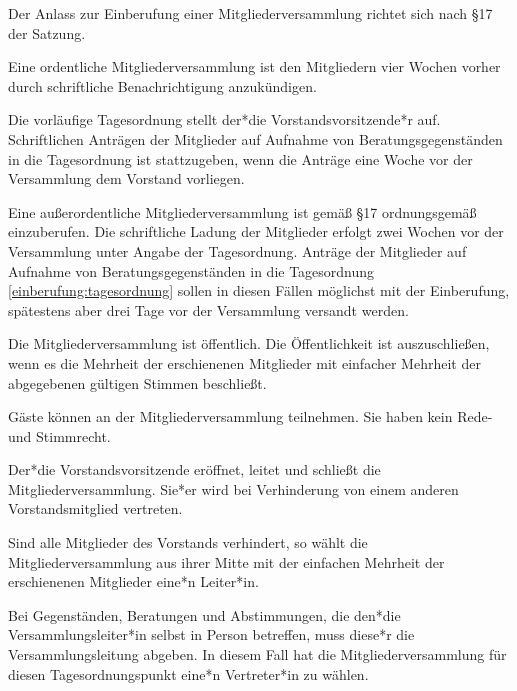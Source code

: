 \begin{gfmitglieder}


  Der Anlass zur Einberufung einer Mitgliederversammlung richtet sich nach \S 17 der Satzung.

  Eine ordentliche Mitgliederversammlung ist den Mitgliedern vier Wochen vorher durch schriftliche Benachrichtigung anzukündigen.

  Die vorläufige Tagesordnung stellt der*die Vorstandsvorsitzende*r auf. Schriftlichen Anträgen der Mitglieder auf Aufnahme von Beratungsgegenständen in die Tagesordnung ist stattzugeben, wenn die Anträge eine Woche vor der Versammlung dem Vorstand vorliegen.
  \label{einberufung:tagesordnung}

  Eine au\ss{}erordentliche Mitgliederversammlung ist gemä\ss{} \S 17 ordnungsgemä\ss{} einzuberufen. Die schriftliche Ladung der Mitglieder erfolgt zwei Wochen vor der Versammlung unter Angabe der Tagesordnung. Anträge der Mitglieder auf Aufnahme von Beratungsgegenständen in die Tagesordnung \ref{einberufung:tagesordnung} sollen in diesen Fällen möglichst mit der Einberufung, spätestens aber drei Tage vor der Versammlung versandt werden.


  Die Mitgliederversammlung ist öffentlich. Die Öffentlichkeit ist auszuschlie\ss{}en, wenn es die Mehrheit der erschienenen Mitglieder mit einfacher Mehrheit der abgegebenen gültigen Stimmen beschlie\ss{}t.

  Gäste können an der Mitgliederversammlung teilnehmen. Sie haben kein Rede- und Stimmrecht.


  Der*die Vorstandsvorsitzende eröffnet, leitet und schlie\ss{}t die Mitgliederversammlung. Sie*er wird bei Verhinderung von einem anderen Vorstandsmitglied vertreten.

  Sind alle Mitglieder des Vorstands verhindert, so wählt die Mitgliederversammlung aus ihrer Mitte mit der einfachen Mehrheit der erschienenen Mitglieder eine*n Leiter*in.

  Bei Gegenständen, Beratungen und Abstimmungen, die den*die Versammlungsleiter*in selbst in Person betreffen, muss diese*r die Versammlungsleitung abgeben. In diesem Fall hat die Mitgliederversammlung für diesen Tagesordnungspunkt eine*n Vertreter*in zu wählen.



\end{gfmitglieder}
